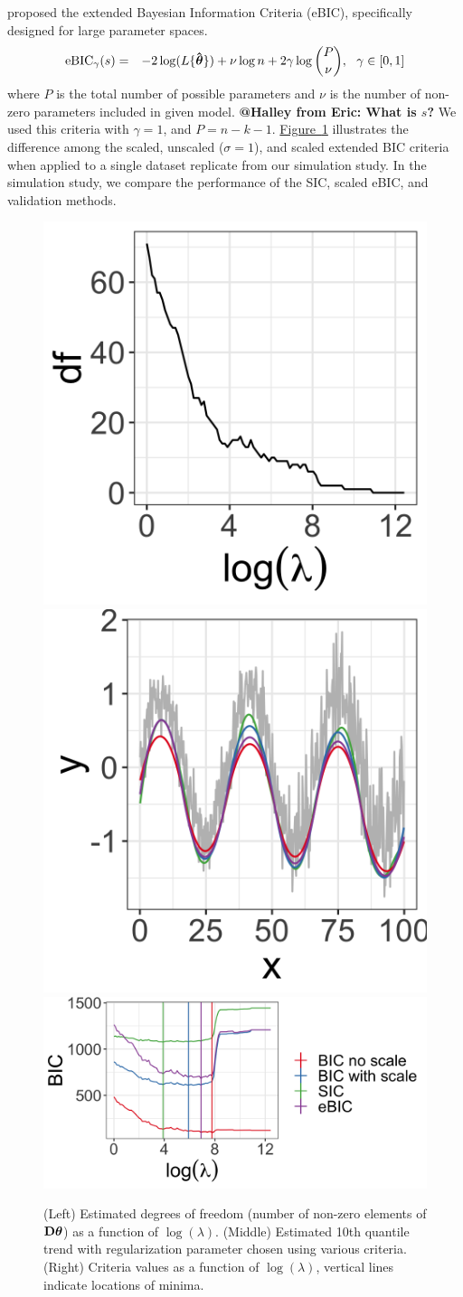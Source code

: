\documentclass[12pt]{article}
\makeatletter
\newcommand{\Halley}[2]{{\bf {\color{purple}@Halley from #1: #2}}\xspace}
\newcommand{\Fig}[1]{\hyperref[fig:#1]{Figure~\ref*{fig:#1}}} %
\newcommand{\Fig}[1]{{Figure~\ref{fig:#1}}} %
\newcommand{\V}[1]{{\bm{\mathbf{\MakeLowercase{#1}}}}} %
\newcommand{\Vhat}[1]{{\bm{\hat \mathbf{\MakeLowercase{#1}}}}} %
\newcommand{\M}[1]{{\bm{\mathbf{\MakeUppercase{#1}}}}} %
\makeatother
\begin{document}
	\cite{chen2008} proposed the extended Bayesian Information Criteria (eBIC), specifically designed for large parameter spaces. 
	\begin{eqnarray*}
	\label{eq:eBIC}
	\mbox{eBIC}_{\gamma}(s) & = & -2\log(L\{\Vhat{\theta}\}) + \nu\log n  + 2\gamma\log{P \choose \nu},~~\gamma \in [0,1]
	\end{eqnarray*}
	where $P$ is the total number of possible parameters and $\nu$ is the number of non-zero parameters included in given model. \Halley{Eric}{What is $s$?} We used this criteria with $\gamma = 1$, and $P=n-k-1$. \Fig{BIC} illustrates the difference among the scaled, unscaled ($\sigma = 1$), and scaled extended BIC criteria
	when applied to a single dataset replicate from our simulation study. In the simulation study, we compare the performance of the SIC, scaled eBIC, and validation methods. 
	
	\begin{figure}[h!]
		\includegraphics[width = 0.25\linewidth]{Figures/df_by_lambda.png}
		\includegraphics[width = 0.25\linewidth]{Figures/BIC_data.png}
		\includegraphics[width = 0.5\linewidth]{Figures/BIC_by_lambda.png} 
		\caption{(Left) Estimated degrees of freedom (number of non-zero elements of $\M{D}\V{\theta}$) as a function of $\log(\lambda)$. (Middle) Estimated 10th quantile trend with regularization parameter chosen using various criteria. (Right) Criteria values as a function of $\log(\lambda)$, vertical lines indicate locations of minima.} 
		\label{fig:BIC}
	\end{figure}
\end{document}
